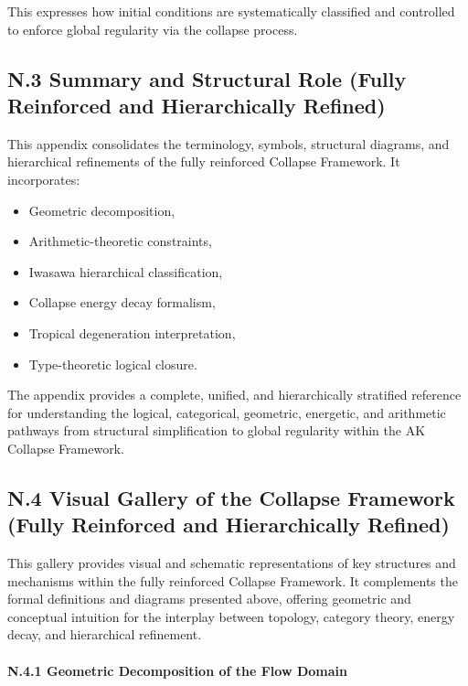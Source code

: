 \documentclass[11pt]{article}
\begin{document}
This expresses how initial conditions are systematically classified and controlled to enforce global regularity via the collapse process.

\subsection*{N.3 Summary and Structural Role (Fully Reinforced and Hierarchically Refined)}

This appendix consolidates the terminology, symbols, structural diagrams, and hierarchical refinements of the fully reinforced Collapse Framework.  
It incorporates:

\begin{itemize}
  \item Geometric decomposition,
  \item Arithmetic-theoretic constraints,
  \item Iwasawa hierarchical classification,
  \item Collapse energy decay formalism,
  \item Tropical degeneration interpretation,
  \item Type-theoretic logical closure.
\end{itemize}

The appendix provides a complete, unified, and hierarchically stratified reference for understanding the logical, categorical, geometric, energetic, and arithmetic pathways from structural simplification to global regularity within the AK Collapse Framework.



\subsection*{N.4 Visual Gallery of the Collapse Framework (Fully Reinforced and Hierarchically Refined)}

This gallery provides visual and schematic representations of key structures and mechanisms within the fully reinforced Collapse Framework.  
It complements the formal definitions and diagrams presented above, offering geometric and conceptual intuition for the interplay between topology, category theory, energy decay, and hierarchical refinement.

\paragraph{N.4.1 Geometric Decomposition of the Flow Domain}
\end{document}
